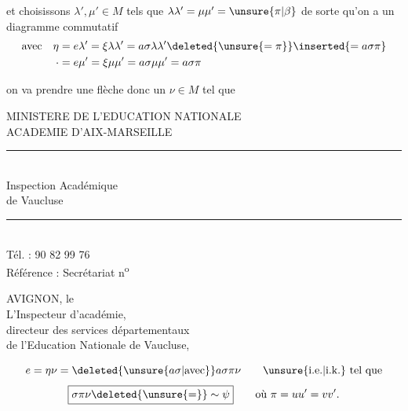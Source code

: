 et choisissons $\lambda',\mu'\in M$ tels que $\lambda\lambda'=\mu\mu'=\unsure{\pi|\beta}$ de sorte qu'on a un diagramme commutatif
\[
\begin{aligned}\text{avec}\quad\eta&=e\lambda'=\xi\lambda\lambda'=a\sigma\lambda\lambda'\deleted{\unsure{=\pi}}\inserted{=a\sigma\pi}\\ \cdot&=e\mu'=\xi\mu\mu'=a\sigma\mu\mu'=a\sigma\pi\end{aligned}
\]

on va  prendre une flèche  donc un $\nu\in M$ tel que
\par\smallskip
{\footnotesize\noindent\begin{minipage}[t]{.46\linewidth}\raggedright
MINISTERE DE L'EDUCATION NATIONALE\\ ACADEMIE D'AIX-MARSEILLE\\ \rule{2.6em}{.3pt}\\ Inspection Académique\\ de Vaucluse\\ \rule{2.6em}{.3pt}\\ Tél. : 90 82 99 76\\ Référence : Secrétariat n\textsuperscript{o}
\end{minipage}\hfill%
\begin{minipage}[t]{.51\linewidth}\raggedright
AVIGNON, le\\ L'Inspecteur d'académie,\\ directeur des services départementaux\\ de l'Education Nationale de Vaucluse,\\ 
\end{minipage}\par}


\[
e=\eta\nu=\deleted{\unsure{a\sigma|\text{avec}}}a\sigma\pi\nu\qquad\text{\unsure{i.e.|i.k.} tel que}
\]
\[
\boxed{\sigma\pi\nu\deleted{\unsure{=}}\sim\psi}\qquad\text{où }\pi=uu'=vv'.
\]

